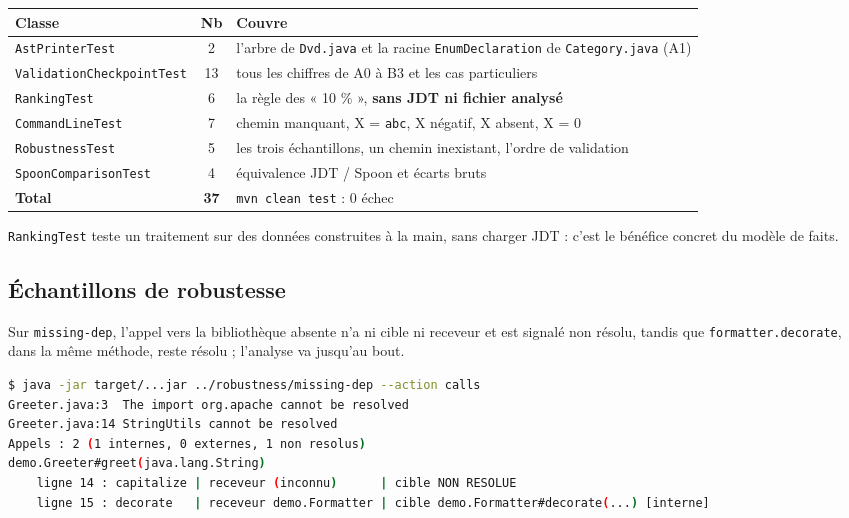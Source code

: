 \documentclass[11pt,a4paper]{article}
\begin{document}
\begin{table}[H]
\centering\small
\begin{tabular}{@{}lcp{8.4cm}@{}}
\toprule
\textbf{Classe} & \textbf{Nb} & \textbf{Couvre} \\
\midrule
\texttt{AstPrinterTest} & 2 & l'arbre de \texttt{Dvd.java} et la racine \texttt{EnumDeclaration} de \texttt{Category.java} (A1) \\
\texttt{ValidationCheckpointTest} & 13 & tous les chiffres de A0 à B3 et les cas particuliers \\
\texttt{RankingTest} & 6 & la règle des « 10 \% », \textbf{sans JDT ni fichier analysé} \\
\texttt{CommandLineTest} & 7 & chemin manquant, X = \texttt{abc}, X négatif, X absent, X = 0 \\
\texttt{RobustnessTest} & 5 & les trois échantillons, un chemin inexistant, l'ordre de validation \\
\texttt{SpoonComparisonTest} & 4 & équivalence JDT / Spoon et écarts bruts \\
\midrule
\textbf{Total} & \textbf{37} & \texttt{mvn clean test} : 0 échec \\
\bottomrule
\end{tabular}
\end{table}

\texttt{RankingTest} teste un traitement sur des données construites à la main, sans charger JDT : c'est le bénéfice concret du modèle de faits.

\subsection{Échantillons de robustesse}

Sur \texttt{missing-dep}, l'appel vers la bibliothèque absente n'a ni cible ni receveur et est signalé non résolu, tandis que \texttt{formatter.decorate}, dans la même méthode, reste résolu ; l'analyse va jusqu'au bout.

\begin{lstlisting}[language=bash]
$ java -jar target/...jar ../robustness/missing-dep --action calls
Greeter.java:3  The import org.apache cannot be resolved
Greeter.java:14 StringUtils cannot be resolved
Appels : 2 (1 internes, 0 externes, 1 non resolus)
demo.Greeter#greet(java.lang.String)
    ligne 14 : capitalize | receveur (inconnu)      | cible NON RESOLUE
    ligne 15 : decorate   | receveur demo.Formatter | cible demo.Formatter#decorate(...) [interne]
\end{lstlisting}
\end{document}
